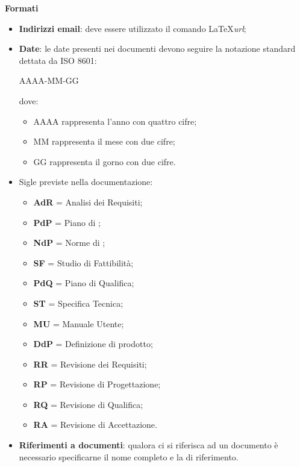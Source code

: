 \textbf{Formati} 
\begin{itemize}
\item \textbf{Indirizzi email}: deve essere utilizzato il comando \LaTeX \textit{url};
\item \textbf{Date}: le date presenti nei documenti devono seguire la notazione standard dettata da ISO 8601:

  \begin{center}
    AAAA-MM-GG
  \end{center}
  
  dove:
  \begin{itemize}
  \item AAAA rappresenta l'anno con quattro cifre;
  \item MM rappresenta il mese con due cifre;
  \item GG rappresenta il gorno con due cifre.
  \end{itemize}
\item Sigle previste nella documentazione:
  \begin{itemize}
  \item \textbf{AdR} = Analisi dei Requisiti;
  \item \textbf{PdP} = Piano di ;
  \item \textbf{NdP} = Norme di ;
  \item \textbf{SF} = Studio di Fattibilità;
  \item \textbf{PdQ} = Piano di Qualifica;
  \item \textbf{ST} = Specifica Tecnica;
  \item \textbf{MU} = Manuale Utente;
  \item \textbf{DdP} = Definizione di prodotto;
  \item \textbf{RR} = Revisione dei Requisiti;
  \item \textbf{RP} = Revisione di Progettazione;
  \item \textbf{RQ} = Revisione di Qualifica;
  \item \textbf{RA} = Revisione di Accettazione.
  \end{itemize}
\item \textbf{Riferimenti a documenti}: qualora ci si riferisca ad un documento è necessario specificarne il nome completo e la  di riferimento.
\end{itemize}




